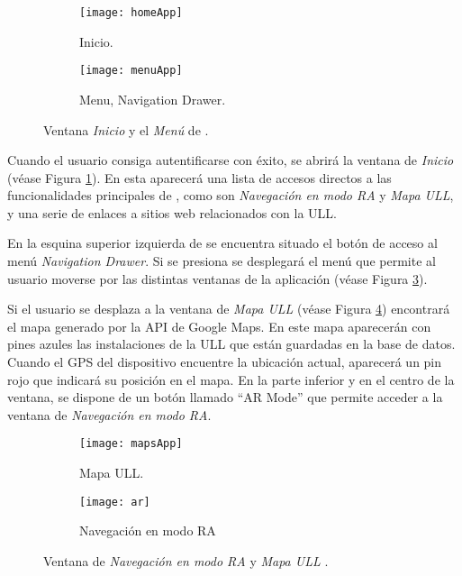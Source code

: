 \begin{figure}[h]
    \hspace*{\fill}%
    \begin{subfigure}[h]{0.32\linewidth}
    \texttt{[image: homeApp]}
    \caption{Inicio.}
    \label{fig:homeApp}
    \end{subfigure} 
    \hfill%
    \begin{subfigure}[h]{0.31\linewidth}
    \texttt{[image: menuApp]}
    \caption{Menu, Navigation Drawer.}
    \label{fig:menuApp}
    \end{subfigure}
    \caption{Ventana \textit{Inicio} y el \textit{Menú} de \textit{\ULLAR{}}.}
    \hspace*{\fill}
\end{figure}

Cuando el usuario consiga autentificarse con éxito, se abrirá la ventana de \textit{Inicio} (véase Figura \ref{fig:homeApp}). En esta aparecerá una lista de accesos directos a las funcionalidades principales de \ULLAR{}, como son \textit{Navegación en modo RA} y \textit{Mapa ULL}, y una serie de enlaces a sitios web relacionados con la ULL.

En la esquina superior izquierda de \ULLAR{} se encuentra situado el botón de acceso al menú \textit{Navigation Drawer}. Si se presiona se desplegará el menú que permite al usuario moverse por las distintas ventanas de la aplicación (véase Figura \ref{fig:menuApp}).

Si el usuario se desplaza a la ventana de \textit{Mapa ULL} (véase Figura \ref{fig:mapsApp}) encontrará el mapa generado por la API de Google Maps. En este mapa aparecerán con pines azules las instalaciones de la ULL que están guardadas en la base de datos. Cuando el GPS del dispositivo encuentre la ubicación actual, aparecerá un pin rojo que indicará su posición en el mapa. En la parte inferior y en el centro de la ventana, se dispone de un botón llamado ``AR Mode'' que permite acceder a la ventana de \textit{Navegación en modo RA}.
  
\begin{figure}[h]
    \hspace*{\fill}%
    \begin{subfigure}[h]{0.37\linewidth}
        \texttt{[image: mapsApp]}
        \caption{Mapa ULL.}
        \label{fig:mapsApp}
    \end{subfigure}
    \hfill%
    \begin{subfigure}[h]{0.37\linewidth}
        \texttt{[image: ar]}
        \caption{Navegación en modo RA}
        \label{fig:menussApp}
    \end{subfigure}%
    \caption{Ventana de  \textit{Navegación en modo RA} y \textit{Mapa ULL} \textit{\ULLAR{}}.}
    \hspace*{\fill}%
\end{figure}

